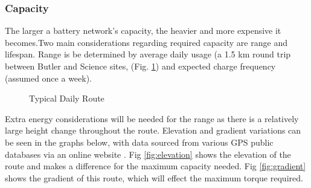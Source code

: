\documentclass[journal,10pt]{IEEEtran}
\begin{document}
        \subsubsection{Capacity}
            The larger a battery network's capacity, the heavier and more expensive it becomes.Two main considerations regarding required capacity are range and lifespan. Range is be determined by average daily usage (a 1.5 km round trip between Butler and Science sites, (Fig. \ref{fig:route}) and expected charge frequency (assumed once a week).
            \begin{figure}[H]
                \centering
                \caption{Typical Daily Route}
                \label{fig:route}
            \end{figure}
            Extra energy considerations will be needed for the range as there is a relatively large height change throughout the route.
            Elevation and gradient variations can be seen in the graphs below, with data sourced from various GPS public databases via an online website \cite{GPSDatabase}.
            Fig \ref{fig:elevation} shows the elevation of the route and makes a difference for the maximum capacity needed.
            Fig \ref{fig:gradient} shows the gradient of this route, which will effect the maximum torque required.
\end{document}

